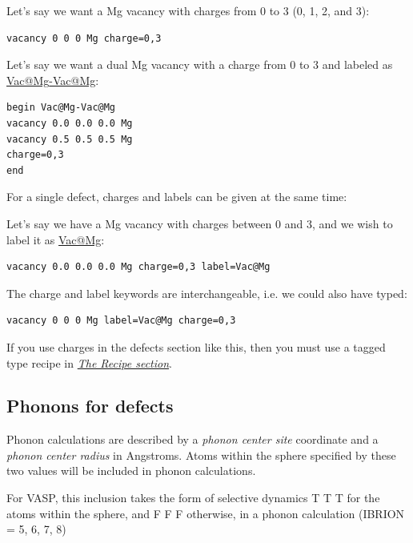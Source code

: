\documentclass[letterpaper,10pt,english]{sphinxmanual}
\begin{document}
Let's say we want a Mg vacancy with charges from 0 to 3 (0, 1, 2, and 3):

\begin{Verbatim}[commandchars=\\\{\}]
vacancy 0 0 0 Mg charge=0,3
\end{Verbatim}

Let's say we want a dual Mg vacancy with a charge from 0 to 3 and labeled as \href{mailto:Vac@Mg}{Vac@Mg}\href{mailto:-Vac@Mg}{-Vac@Mg}:

\begin{Verbatim}[commandchars=\\\{\}]
begin Vac@Mg-Vac@Mg
vacancy 0.0 0.0 0.0 Mg
vacancy 0.5 0.5 0.5 Mg
charge=0,3
end
\end{Verbatim}

For a single defect, charges and labels can be given at the same time:

Let's say we have a Mg vacancy with charges between 0 and 3, and we wish to label it as \href{mailto:Vac@Mg}{Vac@Mg}:

\begin{Verbatim}[commandchars=\\\{\}]
vacancy 0.0 0.0 0.0 Mg charge=0,3 label=Vac@Mg
\end{Verbatim}

The charge and label keywords are interchangeable, i.e. we could also have typed:

\begin{Verbatim}[commandchars=\\\{\}]
vacancy 0 0 0 Mg label=Vac@Mg charge=0,3
\end{Verbatim}

If you use charges in the defects section like this, then you must use a tagged  type recipe in {\hyperref[3_1_3_recipe::doc]{\emph{The Recipe section}}}.


\subsection{Phonons for defects}
\label{3_1_5_defects:phonons-for-defects}
Phonon calculations are described by a \emph{phonon center site} coordinate and a \emph{phonon center radius} in Angstroms. Atoms within the sphere specified by these two values will be included in phonon calculations.

For VASP, this inclusion takes the form of selective dynamics T T T for the atoms within the sphere, and F F F otherwise, in a phonon calculation (IBRION = 5, 6, 7, 8)
\end{document}
